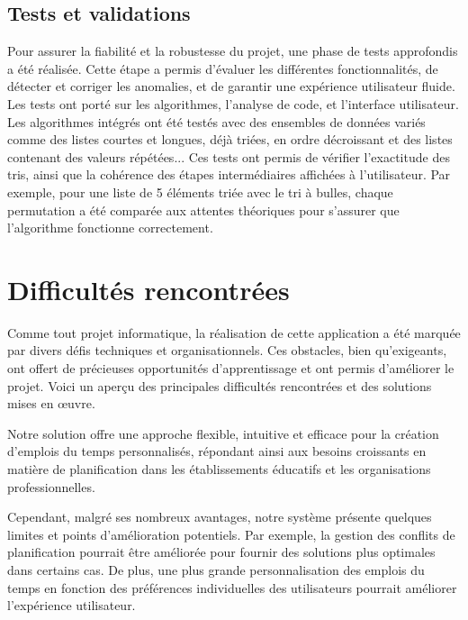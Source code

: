 \documentclass[a4paper, 12pt, twoside]{article}
\begin{document}
\subsection{Tests et validations}
Pour assurer la fiabilité et la robustesse du projet, une phase de tests approfondis a été réalisée. Cette étape a permis d’évaluer les différentes fonctionnalités, de détecter et corriger les anomalies, et de garantir une expérience utilisateur fluide. Les tests ont porté sur les algorithmes, l’analyse de code, et l’interface utilisateur.
\newline
Les algorithmes intégrés ont été testés avec des ensembles de données variés comme des listes courtes et longues, déjà triées, en ordre décroissant et des listes contenant des valeurs répétées...
\newline
Ces tests ont permis de vérifier l’exactitude des tris, ainsi que la cohérence des étapes intermédiaires affichées à l’utilisateur. Par exemple, pour une liste de 5 éléments triée avec le tri à bulles, chaque permutation a été comparée aux attentes théoriques pour s'assurer que l'algorithme fonctionne correctement.
\newpage
\section{Difficultés rencontrées}
\vspace{40pt}
Comme tout projet informatique, la réalisation de cette application a été marquée par divers défis techniques et organisationnels. Ces obstacles, bien qu’exigeants, ont offert de précieuses opportunités d’apprentissage et ont permis d’améliorer le projet. Voici un aperçu des principales difficultés rencontrées et des solutions mises en œuvre.
\newline

Notre solution offre une approche flexible, intuitive et efficace pour la création d'emplois du temps personnalisés, répondant ainsi aux besoins croissants en matière de planification dans les établissements éducatifs et les organisations professionnelles.

Cependant, malgré ses nombreux avantages, notre système présente quelques limites et points d'amélioration potentiels. Par exemple, la gestion des conflits de planification pourrait être améliorée pour fournir des solutions plus optimales dans certains cas. De plus, une plus grande personnalisation des emplois du temps en fonction des préférences individuelles des utilisateurs pourrait améliorer l'expérience utilisateur.
\newline
\vspace{12pt}
\end{document}
